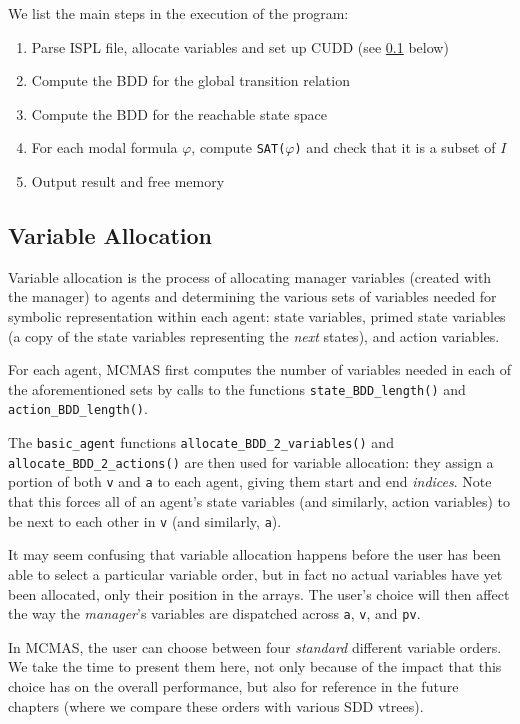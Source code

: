 \documentclass[11pt]{report}
\begin{document}
We list the main steps in the execution of the program:
\begin{enumerate}
\item Parse ISPL file, allocate variables and set up CUDD (see \ref{variable_allocation} below)
\item Compute the BDD for the global transition relation
\item Compute the BDD for the reachable state space 
\item For each modal formula $\varphi$, compute
\texttt{SAT($\varphi$)} and check that it is a subset of $I$
\item Output result and free memory
\end{enumerate}


\subsection{Variable Allocation}
\label{variable_allocation}
Variable allocation is the process of allocating manager variables (created with the manager) to agents and determining the various sets of variables needed for symbolic representation within each agent: state variables, primed state variables (a copy of the state variables representing the \textit{next }states), and action variables.

For each agent, MCMAS first computes the number of variables needed in each of the aforementioned sets by calls to the functions \texttt{state\_BDD\_length()} and \texttt{action\_BDD\_length()}.

The \texttt{basic\_agent} functions \texttt{allocate\_BDD\_2\_variables()} and \texttt{allocate\_BDD\_2\_actions()} are then used for variable allocation: they assign a portion of both \texttt{v} and \texttt{a} to each agent, giving them start and end \textit{indices}. Note that this forces all of an agent's state variables (and similarly, action variables) to be next to each other in \texttt{v} (and similarly, \texttt{a}). 

It may seem confusing that variable allocation happens before the user has been able to select a particular variable order, but in fact no actual variables have yet been allocated, only their position in the arrays. The user's choice will then affect the way the \textit{manager}'s variables are dispatched across \texttt{a}, \texttt{v}, and \texttt{pv}. 

In MCMAS, the user can choose between four \textit{standard} different variable orders. We take the time to present them here, not only because of the impact that this choice has on the overall performance, but also for reference in the future chapters (where we compare these orders with various SDD vtrees).
\end{document}
